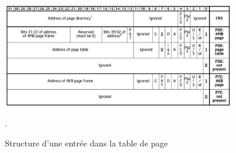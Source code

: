 \begin{figure}
    \center
    \includegraphics[width=10cm]{images/memory_page_table_entry_intel.png}
    \caption{\label{pic:memory_page_table_entry_intel} Structure d'une entrée dans la table de page \cite{intel64and}}.
\end{figure}



